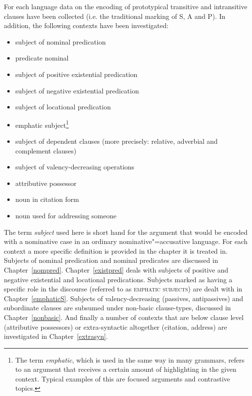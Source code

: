 For each language data on the encoding of prototypical transitive and intransitive clauses have been collected (i.e. the traditional marking of S, A and P). 
In addition, the following contexts have been investigated: 

\begin{itemize}
\item subject of nominal predication
\item predicate nominal
\item subject of positive existential predication
\item subject of negative existential predication
\item subject of locational predication
\item emphatic subject\footnote{The term \textit{emphatic}, which is used in the same way in many grammars, refers to an argument that receives a certain amount of highlighting in the given context. Typical examples of this are focused arguments and contrastive topics.}
\item subject of dependent clauses (more precisely: relative, adverbial and complement clauses)
\item subject of valency-decreasing operations 
\item attributive possessor
\item noun in citation form
\item noun used for addressing someone
\end{itemize}

The term \textit{subject} used here is short hand for the argument that would be encoded with a nominative case in an ordinary nominative"=accusative language. 
For each context a more specific definition is provided in the chapter it is treated in. 
Subjects of nominal predication and nominal predicates are discussed in Chapter~\ref{nompred}. 
Chapter~\ref{existpred} deals with subjects of positive and negative existential and locational predications. 
Subjects marked as having a specific role in the discourse (referred to as \textsc{emphatic subjects}) are dealt with in Chapter~\ref{emphaticS}.  
Subjects of %
valency-decreasing (passives, antipassives) and subordinate clauses are subsumed under non-basic clause-types, discussed in Chapter~\ref{nonbasic}. 
And finally a number of contexts that are below clause level (attributive possessors) or extra-syntactic altogether (citation, address) are investigated in Chapter~\ref{extrasyn}.

